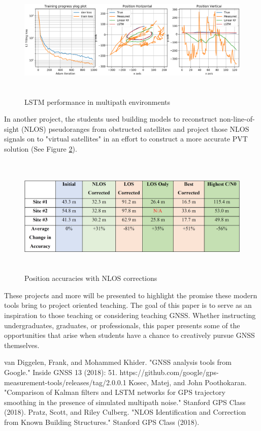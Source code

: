 \documentclass[12pt, conference, onecolumn, draftclsnofoot]{IEEEtran}
\begin{document}
\begin{figure}[H]
    \centering
    \includegraphics[width=6.5in, height=2.25in]{Figures/Mateh-LSTM.PNG}
    \caption{LSTM performance in multipath environments}
    \label{LSTM}
\end{figure}

In another project, the students used building models to reconstruct non-line-of-sight (NLOS) pseudoranges from obstructed satellites and project those NLOS signals on to "virtual satellites" in an effort to construct a more accurate PVT solution \cite{NLOS2018} (See Figure \ref{NLOS}).

\begin{figure}[H]
    \centering
    \includegraphics[width=6.5in, height=2.25in]{Figures/NLOS-Table.PNG}
    \caption{Position accuracies with NLOS corrections}
    \label{NLOS}
\end{figure}

These projects and more will be presented to highlight the promise these modern tools bring to project oriented teaching.
The goal of this paper is to serve as an inspiration to those teaching or considering teaching GNSS.
Whether instructing undergraduates, graduates, or professionals, this paper presents some of the opportunities that arise when students have a chance to creatively pursue GNSS themselves.

\begin{thebibliography}{00}
     van Diggelen, Frank, and Mohammed Khider. "GNSS analysis tools from Google." Inside GNSS 13 (2018): 51. 
     https://github.com/google/gps-measurement-tools/releases/tag/2.0.0.1
     Kosec, Matej, and John Poothokaran. "Comparison of Kalman filters and LSTM networks for GPS trajectory smoothing in the presence of simulated multipath noise." Stanford GPS Class (2018).
     Pratz, Scott, and Riley Culberg. "NLOS Identification and Correction from Known Building Structures." Stanford GPS Class (2018).
    
\end{thebibliography}
\end{document}
